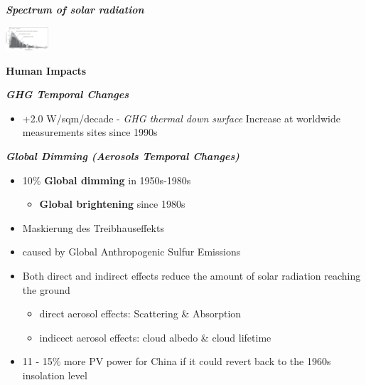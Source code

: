 \documentclass[fontsize=8pt, a4paper, landscape, fleqn]{scrartcl}
\renewcommand{\subsection}[1]{%
    \noindent\colorbox{subsectioncolor}{%
        \parbox{\dimexpr\columnwidth-2\fboxsep}{\color{white}\textbf{#1}}}%
    \vspace{0.5mm}%
}
\renewcommand{\subsubsection}[1]{%
    \noindent\textbf{\textit{\color{subsectioncolor}#1}}%
    \vspace{1mm}%
}
\begin{document}
\begin{multicols*}{3}[\raggedcolumns]
\subsubsection{Spectrum of solar radiation}
\begin{center}
    \includegraphics[width=0.12\textwidth]{Secondary/img/Pasted image 20250408120900.png}
\end{center}

\subsection{Human Impacts}
\subsubsection{GHG Temporal Changes}
\begin{itemize}
    \item +2.0 W/sqm/decade - \textit{GHG thermal down surface} Increase at worldwide measurements sites since 1990s
\end{itemize}

\subsubsection{Global Dimming (Aerosols Temporal Changes)}
\begin{itemize}
    \item 10\% \textbf{Global dimming} in 1950s-1980s
        \begin{itemize}
            \item \textbf{Global brightening} since 1980s
        \end{itemize}
    \item Maskierung des Treibhauseffekts
    \item caused by Global Anthropogenic Sulfur Emissions
    \item Both direct and indirect effects reduce the amount of solar radiation reaching the ground
        \begin{itemize}
            \item direct aerosol effects: Scattering \& Absorption
            \item indicect aerosol effects: cloud albedo \& cloud lifetime
        \end{itemize}
    \item 11 - 15\% more PV power for China if it could revert back to the 1960s insolation level
\end{itemize}


\end{multicols*}
\end{document}
